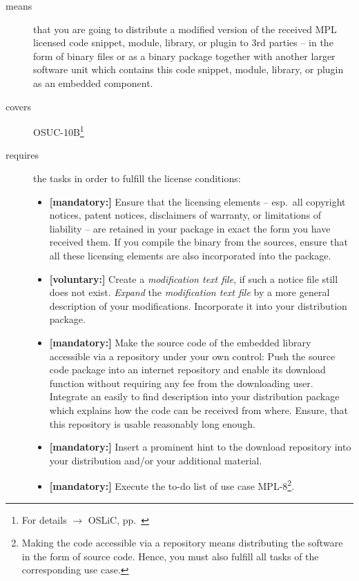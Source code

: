 \begin{description}
\item[means] that you are going to distribute a modified version of the received
MPL licensed code snippet, module, library, or plugin to 3rd parties -- in the
form of binary files or as a binary package together with another larger
software unit which contains this code snippet, module, library, or plugin as an
embedded component.
\item[covers] OSUC-10B\footnote{For details $\rightarrow$ OSLiC, pp.\
\pageref{OSUC-10B-DEF}}
\item[requires] the tasks in order to fulfill the license conditions:
\begin{itemize}

  \item \textbf{[mandatory:]} Ensure that the licensing elements -- esp.\ all
  copyright notices, patent notices, disclaimers of warranty, or limitations of
  liability -- are retained in your package in exact the form you have received
  them. If you compile the binary from the sources, ensure that all these
  licensing elements are also incorporated into the package.
  
  \item \textbf{[voluntary:]} Create a \emph{modification text file}, if such a
  notice file still does not exist. \emph{Expand} the \emph{modification text
  file} by a more general description of your modifications. Incorporate it into
  your distribution package.

  \item \textbf{[mandatory:]} Make the source code of the embedded library
  accessible via a repository under your own control: Push the source code
  package into an internet repository and enable its download function without
  requiring any fee from the downloading user. Integrate an easily to find
  description into your distribution package which explains how the code can be
  received from where. Ensure, that this repository is usable reasonably long
  enough.
  
  \item \textbf{[mandatory:]} Insert a prominent hint to the download repository
  into your distribution and/or your additional material.

  \item \textbf{[mandatory:]} Execute the to-do list of use case MPL-8\footnote{
  Making the code accessible via a repository means distributing the software in
  the form of source code. Hence, you must also fulfill all tasks of the
  corresponding use case.}.
  

\end{itemize}
\end{description}
